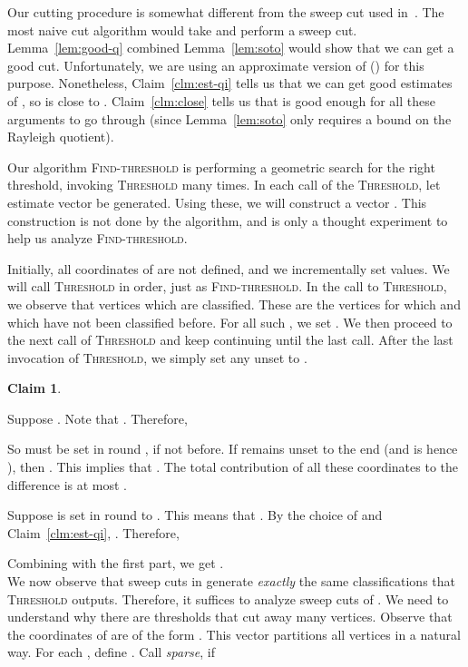\documentclass[11pt]{article}
\newtheorem{claim}[theorem]{Claim}
\newenvironment{myproof}{\noindent {\sc Proof:}}{}
\newcommand\Threshold{\textsc{Threshold}\xspace}
\newcommand\Find{\textsc{Find-threshold}\xspace}
\begin{document}
\begin{myproof} Our cutting procedure is somewhat different from the
sweep cut used in~\cite{Tre09}. The most naive cut algorithm would
take  and perform a sweep cut. Lemma~\ref{lem:good-q} combined
Lemma~\ref{lem:soto} would show that we can get a good cut. Unfortunately,
we are using an approximate version of  () for this purpose.
Nonetheless, Claim~\ref{clm:est-qi} tells us that we can get
good estimates of , so  is close to . Claim~\ref{clm:close}
tells us that  is good enough for all these arguments to go through
(since Lemma~\ref{lem:soto} only requires a bound on the Rayleigh quotient).

Our algorithm {\Find} is performing a geometric search for the right
threshold, invoking {\Threshold} many times. In each call
of the {\Threshold}, let estimate vector 
be generated. Using these, we will construct a vector .
This construction is not done by the algorithm, and is only
a thought experiment to help us analyze {\Find}.

Initially, all coordinates of  are not defined, and we
incrementally set values. We will call {\Threshold}
in order, just as {\Find}. In the call to {\Threshold},
we observe that vertices which are classified. These are
the vertices  for which  and
which have not been classified before. For all such ,
we set . We then proceed to the next
call of {\Threshold} and keep continuing until
the last call. After the last invocation of {\Threshold},
we simply set any unset  to .

\begin{claim} \label{clm:qti} 
\end{claim}

\begin{myproof} Suppose . Note that .
Therefore,

So  must be set in round , if not before. If  remains
unset to the end (and is hence ), then .
This implies that . The total contribution
of all these coordinates to the difference  is
at most .

Suppose  is set in round  to . This means
that . By the choice of  and Claim~\ref{clm:est-qi},
.
Therefore,

Combining with the first part, we get .
\end{myproof}\\

We now observe that sweep cuts in  generate \emph{exactly}
the same classifications that {\Threshold} outputs.
Therefore, it suffices to analyze sweep cuts of .
We need to understand why there are thresholds that cut away many vertices.
Observe that the coordinates of  are of the form .
This vector partitions all vertices in a natural way.
For each , define .
Call  \emph{sparse}, if


\end{myproof}
\end{document}
